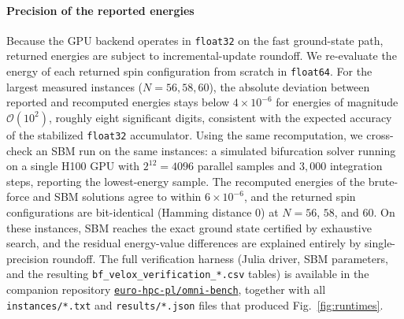 \documentclass[preprint,12pt,a4paper]{elsarticle}
\begin{document}
\paragraph{Precision of the reported energies}
Because the GPU backend operates in \texttt{float32} on the fast ground-state
path, returned energies are subject to incremental-update roundoff. We
re-evaluate the energy of each returned spin configuration from scratch in
\texttt{float64}. For the largest measured instances ($N=56,58,60$), the
absolute deviation between reported and recomputed energies stays below
$4\times 10^{-6}$ for energies of magnitude $\mathcal{O}(10^{2})$,
roughly eight significant digits, consistent with the expected accuracy of
the stabilized \texttt{float32} accumulator. Using the same recomputation,
we cross-check an SBM run on the same instances: a 
simulated bifurcation solver running on a single H100 GPU with
$2^{12}=4096$ parallel samples and $3{,}000$ integration steps, reporting
the lowest-energy sample. The recomputed energies of the brute-force and
SBM solutions agree to within $6\times 10^{-6}$, and the returned spin
configurations are bit-identical (Hamming distance $0$) at $N=56$, $58$,
and $60$. On these instances, SBM reaches the exact ground state certified
by exhaustive search, and the residual energy-value differences are
explained entirely by single-precision roundoff. The full verification
harness (Julia driver, SBM parameters, and the resulting
\texttt{bf\_velox\_verification\_*.csv} tables) is available in the
companion repository
\href{https://github.com/euro-hpc-pl/omni-bench}{\texttt{euro-hpc-pl/omni-bench}},
together with all \texttt{instances/*.txt} and \texttt{results/*.json}
files that produced Fig.~\ref{fig:runtimes}.
\end{document}
